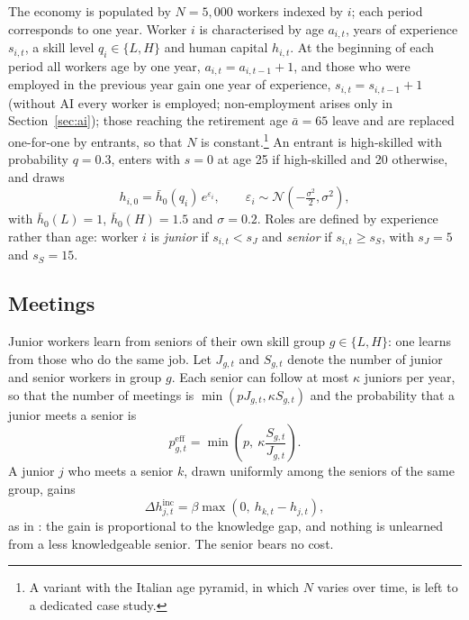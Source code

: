 \documentclass[preprint,12pt,authoryear]{elsarticle}
\begin{document}
The economy is populated by $N=5{,}000$ workers indexed by $i$; each period corresponds to one year. Worker $i$ is characterised by age $a_{i,t}$, years of experience $s_{i,t}$, a skill level $q_i\in\{L,H\}$ and human capital $h_{i,t}$. At the beginning of each period all workers age by one year, $a_{i,t}=a_{i,t-1}+1$, and those who were employed in the previous year gain one year of experience, $s_{i,t}=s_{i,t-1}+1$ (without AI every worker is employed; non-employment arises only in Section~\ref{sec:ai}); those reaching the retirement age $\bar a=65$ leave and are replaced one-for-one by entrants, so that $N$ is constant.\footnote{A variant with the Italian age pyramid, in which $N$ varies over time, is left to a dedicated case study.} An entrant is high-skilled with probability $q=0.3$, enters with $s=0$ at age 25 if high-skilled and 20 otherwise, and draws
\begin{equation}\label{eq:entry}
h_{i,0} = \bar h_0(q_i)\, e^{\varepsilon_i}, \qquad \varepsilon_i \sim \mathcal N\!\left(-\tfrac{\sigma^2}{2},\sigma^2\right),
\end{equation}
with $\bar h_0(L)=1$, $\bar h_0(H)=1.5$ and $\sigma=0.2$. Roles are defined by experience rather than age: worker $i$ is \emph{junior} if $s_{i,t} < s_J$ and \emph{senior} if $s_{i,t} \ge s_S$, with $s_J=5$ and $s_S=15$.

\subsection{Meetings}

Junior workers learn from seniors of their own skill group $g\in\{L,H\}$: one learns from those who do the same job. Let $J_{g,t}$ and $S_{g,t}$ denote the number of junior and senior workers in group $g$. Each senior can follow at most $\kappa$ juniors per year, so that the number of meetings is $\min(pJ_{g,t},\kappa S_{g,t})$ and the probability that a junior meets a senior is
\begin{equation}\label{eq:peff}
p^{\mathrm{eff}}_{g,t} = \min\!\left(p,\ \kappa \frac{S_{g,t}}{J_{g,t}}\right).
\end{equation}
A junior $j$ who meets a senior $k$, drawn uniformly among the seniors of the same group, gains
\begin{equation}\label{eq:meeting}
\Delta h^{\mathrm{inc}}_{j,t} = \beta \max\left(0,\ h_{k,t}-h_{j,t}\right),
\end{equation}
as in \citet{LucasMoll2014}: the gain is proportional to the knowledge gap, and nothing is unlearned from a less knowledgeable senior. The senior bears no cost.
\end{document}
